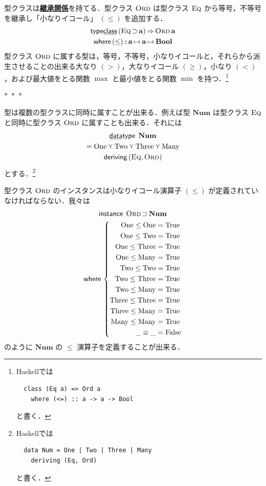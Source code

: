 \documentclass[a4paper,twocolumn]{jsbook}
\newcommand{\separator}{\begin{center}$*$~$*$~$*$\end{center}}
\newcommand{\programminglanguage}[1]{\textsf{#1}}
\newcommand{\haskell}{\programminglanguage{Haskell}}
\newcommand{\keyword}[1]{{\underline{\textbf{#1}}}}
\newcommand{\mKeyword}[1]{\mathsf{#1}} %
\newcommand{\mKeywordUnderline}[1]{\text{\underline{\textsf{#1}}}} %
\newcommand{\mDataTypeKeyword}{\mKeywordUnderline{data}\mKeyword{type}}
\newcommand{\mDerivingKeyword}{\mKeyword{deriving}}
\newcommand{\mInstanceKeyword}{\mKeyword{instance}}
\newcommand{\mTypeClassKeyword}{\mKeyword{type}\mKeywordUnderline{class}}
\newcommand{\mWhereKeyword}{\mKeyword{where}}
\DeclareMathOperator{\mDataType}{\mDataTypeKeyword}
\DeclareMathOperator{\mDeriving}{\mDerivingKeyword}
\DeclareMathOperator{\mInstance}{\mInstanceKeyword}
\DeclareMathOperator{\mSuperClass}{\Rightarrow}
\DeclareMathOperator{\mSuperSet}{\supset}
\DeclareMathOperator{\mTypeClass}{\mTypeClassKeyword}
\DeclareMathOperator{\mWhere}{\mWhereKeyword}
\newcommand{\mConstant}[1]{\mathrm{#1}}
\newcommand{\mSpecialConstant}[1]{\textrm{#1}} %
\newcommand{\mFalse}{\mSpecialConstant{False}}
\newcommand{\mNumOne}{\mSpecialConstant{One}}
\newcommand{\mNumTwo}{\mSpecialConstant{Two}}
\newcommand{\mNumThree}{\mSpecialConstant{Three}}
\newcommand{\mNumMany}{\mSpecialConstant{Many}}
\newcommand{\mTrue}{\mSpecialConstant{True}}
\newcommand{\mAnyParam}{\_}
\DeclareMathOperator{\mIn}{{:\!:}}
\DeclareMathOperator{\mMapsTo}{\mapsto}
\DeclareMathOperator{\mValueOr}{\curlyvee}
\newcommand{\mType}[1]{\mathbf{#1}}
\newcommand{\mBoolType}{\mType{Bool}}
\newcommand{\mGenericTypeClass}[1]{\textsc{#1}} %
\newcommand{\mEqTypeClass}{\mGenericTypeClass{Eq}}
\newcommand{\mOrdTypeClass}{\mGenericTypeClass{Ord}}
\newcommand{\mProj}[2]{#1\mMapsTo#2}
\begin{document}
型クラスは\keyword{継承関係}を持てる．型クラス $\mOrdTypeClass$ は型クラス $\mEqTypeClass$ から等号，不等号を継承し「小なりイコール」 $(\le)$ を追加する．
\begin{multline}
\mTypeClass\,(\mEqTypeClass\mSuperSet\mType{a})\mSuperClass\mathop{\mOrdTypeClass}\mType{a}\\
\mWhere{}
(\le)\mIn\mProj{\mType{a}}{\mProj{\mType{a}}{\mBoolType}}
\end{multline}
型クラス $\mOrdTypeClass$ に属する型は，等号，不等号，小なりイコールと，それらから派生させることの出来る大なり $(>)$，大なりイコール $(\ge)$，小なり $(<)$，および最大値をとる関数 $\max$ と最小値をとる関数 $\min$ を持つ．\footnote{\haskell では
\begin{verbatim}
  class (Eq a) => Ord a
    where (<=) :: a -> a -> Bool
\end{verbatim}
と書く．}

\separator

型は複数の型クラスに同時に属すことが出来る．例えば型 $\mType{Num}$ は型クラス $\mEqTypeClass$ と同時に型クラス $\mOrdTypeClass$ に属すことも出来る．それには
\begin{multline}
\mDataType\;\mType{Num}\\
=\mNumOne\mValueOr\mNumTwo\mValueOr\mNumThree\mValueOr\mNumMany\\
\mDeriving{}(\mEqTypeClass,\mOrdTypeClass)
\end{multline}
とする．\footnote{\haskell では
\begin{verbatim}
  data Num = One | Two | Three | Many
    deriving (Eq, Ord)
\end{verbatim}
と書く．}

型クラス $\mOrdTypeClass$ のインスタンスは小なりイコール演算子 $(\le)$ が定義されていなければならない．我々は
\begin{multline}
\mInstance\;
\mOrdTypeClass\mSuperSet\mType{Num}\\
\mWhere{}
\left\{
\begin{aligned}
\mConstant{One}\le\mConstant{One}&=\mTrue\\
\mConstant{One}\le\mConstant{Two}&=\mTrue\\
\mConstant{One}\le\mConstant{Three}&=\mTrue\\
\mConstant{One}\le\mConstant{Many}&=\mTrue\\
\mConstant{Two}\le\mConstant{Two}&=\mTrue\\
\mConstant{Two}\le\mConstant{Three}&=\mTrue\\
\mConstant{Two}\le\mConstant{Many}&=\mTrue\\
\mConstant{Three}\le\mConstant{Three}&=\mTrue\\
\mConstant{Three}\le\mConstant{Many}&=\mTrue\\
\mConstant{Many}\le\mConstant{Many}&=\mTrue\\
\mAnyParam\equiv\mAnyParam&=\mFalse
\end{aligned}
\right.
\end{multline}
のように $\mType{Num}$ の $\le$ 演算子を定義することが出来る．
\end{document}
